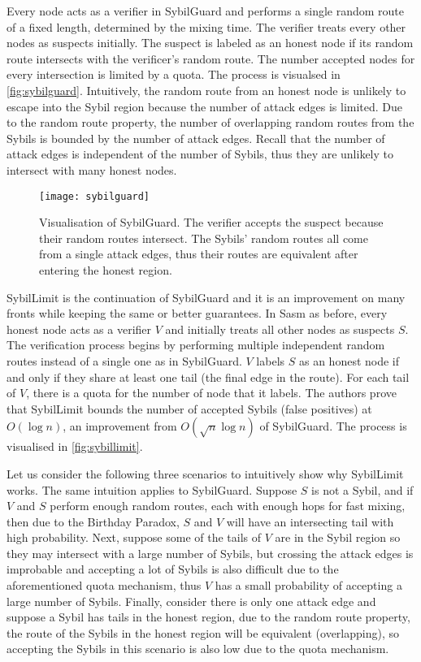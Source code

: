 Every node acts as a verifier in SybilGuard\cite{yu2006sybilguard} and performs
a single random route of a fixed length, determined by the mixing time. The
verifier treats every other nodes as suspects initially. The suspect is labeled
as an honest node if its random route intersects with the verificer's random
route. The number accepted nodes for every intersection is limited by a quota.
The process is visualsed in \autoref{fig:sybilguard}. Intuitively, the random
route from an honest node is unlikely to escape into the Sybil region because
the number of attack edges is limited. Due to the random route property, the
number of overlapping random routes from the Sybils is bounded by the number of
attack edges. Recall that the number of attack edges is independent of the
number of Sybils, thus they are unlikely to intersect with many honest nodes.

\begin{figure}
  \centering
  \texttt{[image: sybilguard]}
  \caption{Visualisation of SybilGuard. The verifier accepts the suspect because
    their random routes intersect. The Sybils' random routes all come from a
    single attack edges, thus their routes are equivalent after entering the
    honest region.}
  \label{fig:sybilguard}
\end{figure}

SybilLimit\cite{yu2008sybillimit} is the continuation of SybilGuard and it is an
improvement on many fronts while keeping the same or better guarantees. In Sasm
as before, every honest node acts as a verifier $V$ and initially treats all
other nodes as suspects $S$. The verification process begins by performing
multiple independent random routes instead of a single one as in SybilGuard. $V$
labels $S$ as an honest node if and only if they share at least one tail (the
final edge in the route). For each tail of $V$, there is a quota for the number
of node that it labels. The authors prove that SybilLimit bounds the number of
accepted Sybils (false positives) at $O(\log{n})$, an improvement from
$O(\sqrt{n} \log{n})$ of SybilGuard. The process is visualised in
\autoref{fig:sybillimit}.

Let us consider the following three scenarios to intuitively show why SybilLimit
works. The same intuition applies to SybilGuard. Suppose $S$ is not a Sybil, and
if $V$ and $S$ perform enough random routes, each with enough hops for fast
mixing, then due to the Birthday Paradox, $S$ and $V$ will have an intersecting
tail with high probability. Next, suppose some of the tails of $V$ are in the
Sybil region so they may intersect with a large number of Sybils, but crossing
the attack edges is improbable and accepting a lot of Sybils is also difficult
due to the aforementioned quota mechanism, thus $V$ has a small probability of
accepting a large number of Sybils. Finally, consider there is only one attack
edge and suppose a Sybil has tails in the honest region, due to the random route
property, the route of the Sybils in the honest region will be equivalent
(overlapping), so accepting the Sybils in this scenario is also low due to the
quota mechanism.

